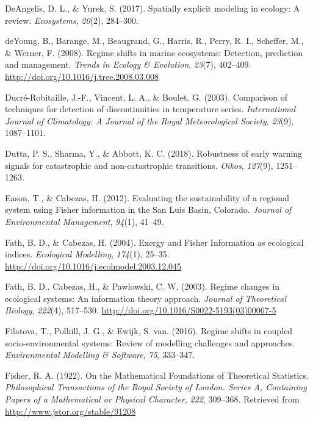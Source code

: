 \documentclass[12pt,twoside,openany]{reedthesis}
\begin{document}
\leavevmode\hypertarget{ref-deangelis2017spatially}{}%
DeAngelis, D. L., \& Yurek, S. (2017). Spatially explicit modeling in ecology: A review. \emph{Ecosystems}, \emph{20}(2), 284--300.

\leavevmode\hypertarget{ref-deyoung_regime_2008}{}%
deYoung, B., Barange, M., Beaugrand, G., Harris, R., Perry, R. I., Scheffer, M., \& Werner, F. (2008). Regime shifts in marine ecosystems: Detection, prediction and management. \emph{Trends in Ecology \& Evolution}, \emph{23}(7), 402--409. \url{http://doi.org/10.1016/j.tree.2008.03.008}

\leavevmode\hypertarget{ref-ducre2003comparison}{}%
Ducré-Robitaille, J.-F., Vincent, L. A., \& Boulet, G. (2003). Comparison of techniques for detection of discontinuities in temperature series. \emph{International Journal of Climatology: A Journal of the Royal Meteorological Society}, \emph{23}(9), 1087--1101.

\leavevmode\hypertarget{ref-dutta2018robustness}{}%
Dutta, P. S., Sharma, Y., \& Abbott, K. C. (2018). Robustness of early warning signals for catastrophic and non-catastrophic transitions. \emph{Oikos}, \emph{127}(9), 1251--1263.

\leavevmode\hypertarget{ref-eason_evaluating_2012}{}%
Eason, T., \& Cabezas, H. (2012). Evaluating the sustainability of a regional system using Fisher information in the San Luis Basin, Colorado. \emph{Journal of Environmental Management}, \emph{94}(1), 41--49.

\leavevmode\hypertarget{ref-fath_exergy_2004}{}%
Fath, B. D., \& Cabezas, H. (2004). Exergy and Fisher Information as ecological indices. \emph{Ecological Modelling}, \emph{174}(1), 25--35. \url{http://doi.org/10.1016/j.ecolmodel.2003.12.045}

\leavevmode\hypertarget{ref-fath_regime_2003}{}%
Fath, B. D., Cabezas, H., \& Pawlowski, C. W. (2003). Regime changes in ecological systems: An information theory approach. \emph{Journal of Theoretical Biology}, \emph{222}(4), 517--530. \url{http://doi.org/10.1016/S0022-5193(03)00067-5}

\leavevmode\hypertarget{ref-filatova2016regime}{}%
Filatova, T., Polhill, J. G., \& Ewijk, S. van. (2016). Regime shifts in coupled socio-environmental systems: Review of modelling challenges and approaches. \emph{Environmental Modelling \& Software}, \emph{75}, 333--347.

\leavevmode\hypertarget{ref-fisher_mathematical_1922}{}%
Fisher, R. A. (1922). On the Mathematical Foundations of Theoretical Statistics. \emph{Philosophical Transactions of the Royal Society of London. Series A, Containing Papers of a Mathematical or Physical Character}, \emph{222}, 309--368. Retrieved from \url{http://www.jstor.org/stable/91208}
\end{document}

